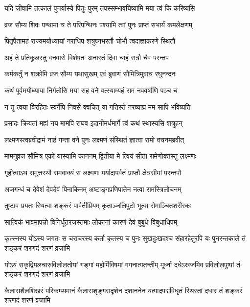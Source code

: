 \twolineshloka
{यदि जीवामि तत्कालं पुनर्यास्ये पितुः पुरम्}
{तपस्सम्भावयिष्यामि मया त्वं किं करिष्यसि} %

\twolineshloka
{व्रज सौम्य शिवः पन्थामा च ते परिपन्थिनः}
{पश्यामि त्वां पुनः प्राप्तं सभार्यं कमलेक्षणम्} %

\twolineshloka
{पितृपैतामहं राज्यमयोध्यायां नराधिप}
{शत्रुघ्नभरतौ चोभौ त्वदाज्ञाकरणे स्थितौ} %

\twolineshloka
{अहं ते प्रतिकूलस्तु वनवासे विशेषतः}
{अनारतं दिवा चाहं रात्रौ चैव परन्तप} %

\twolineshloka
{कर्मकर्तुं न शक्रोमि व्रज सौम्य यथासुखम्}
{एवं ब्रुवाणं सौमित्रिमुवाच रघुनन्दनः} %

\twolineshloka
{कथं पूर्वमयोध्याया निर्गतोसि मया सह}
{वने वत्स्याम्यहं राम नववर्षाणि पञ्च च} %

\twolineshloka
{न तु त्वया विरहितः स्वर्गेपि निवसे क्वचित्}
{या गतिस्ते नरव्याघ्र मम सापि भविष्यति} %

\twolineshloka
{प्रसादः क्रियतां मह्यं नय मामपि राघव}
{इदानीमर्धमार्गे त्वं कथं स्थास्यसि शत्रुहन्} %

\twolineshloka
{लक्ष्मणस्त्वब्रवीद्रामं नाहं गन्ता वने पुनः}
{लक्ष्मणं संस्थितं ज्ञात्वा रामो वचनमब्रवीत्} %

\twolineshloka
{मामनुव्रज सौमित्र एको यास्यामि काननम्}
{द्वितीया मे त्वियं सीता रामेणोक्तस्तु लक्ष्मणः} %

\twolineshloka
{गृहीत्वाऽथ समुत्तस्थौ रामवाक्यं स लक्ष्मणः}
{मर्यादापर्वतं प्राप्तौ क्षेत्रसीमां परन्तपौ} %

\twolineshloka
{अजगन्धं च देवेशं देवदेवं पिनाकिनम्}
{अष्टाङ्गप्रणिपातेन नत्वा रामस्त्रिलोचनम्} %

\twolineshloka
{तुष्टाव प्रयतः स्थित्वा शङ्करं पार्वतीप्रियम्}
{कृताञ्जलिपुटो भूत्वा रोमाञ्चितशरीरकः} %

\twolineshloka
{सात्विकं भावमापन्नो विनिर्धूतरजस्तमाः}
{लोकानां कारणं देवं बुबुधे विबुधाधिपम्} %

\twolineshloka
{कृत्स्नस्य योऽस्य जगतः स चराचरस्य कर्ता कृतस्य च पुनः सुखदुःखदश्च}
{संहारहेतुरपि यः पुनरन्तकाले तं शङ्करं शरणदं शरणं व्रजामि} %

\twolineshloka
{योऽयं सकृद्विमलचारुविलोलतोयां गङ्गां महोर्मिविषमां गगनात्पतन्तीम्}
{मूर्ध्ना दधेऽस्रजमिव प्रविलोलपुष्पां तं शङ्करं शरणदं शरणं व्रजामि} %

\twolineshloka
{कैलासशैलशिखरं परिकम्प्यमानं कैलासशृङ्गसदृशेन दशाननेन}
{यत्पादपद्मविधृतं स्थिरतां दधार तं शङ्करं शरणदं शरणं व्रजामि} %

